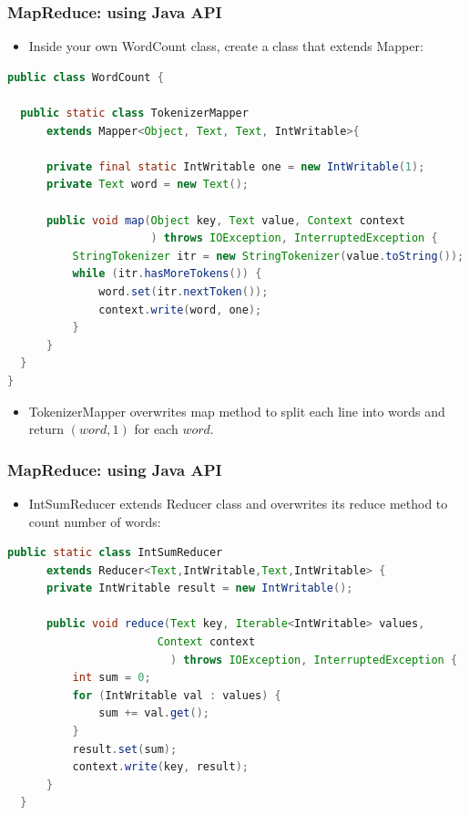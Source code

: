 \documentclass{beamer}
\begin{document}
\begin{frame}[fragile]
 \frametitle{MapReduce: using Java API}

\begin{itemize}
  \item Inside your own {\color{mycolorcode}WordCount} class, create a class that extends {\color{mycolorcode}Mapper}:
\end{itemize}
{\color{mycolorcode}
  \begin{lstlisting}[frame=single, basicstyle=\tiny,language=java]
public class WordCount {

  public static class TokenizerMapper
      extends Mapper<Object, Text, Text, IntWritable>{

      private final static IntWritable one = new IntWritable(1);
      private Text word = new Text();

      public void map(Object key, Text value, Context context
                      ) throws IOException, InterruptedException {
          StringTokenizer itr = new StringTokenizer(value.toString());
          while (itr.hasMoreTokens()) {
              word.set(itr.nextToken());
              context.write(word, one);
          }
      }
  }
}
  \end{lstlisting}
}
\begin{itemize}
  \item {\color{mycolorcode}TokenizerMapper} overwrites {\color{mycolorcode}map} method to split each line into words and return {\color{mycolorcode}$(word, 1)$} for each {\color{mycolorcode}$word$}.
\end{itemize}

\end{frame}


\begin{frame}[fragile]
 \frametitle{MapReduce: using Java API}
\begin{itemize}
  \item {\color{mycolorcode}IntSumReducer} extends {\color{mycolorcode}Reducer} class and overwrites its {\color{mycolorcode}reduce} method to count number of words:
\end{itemize}
{\color{mycolorcode}
  \begin{lstlisting}[frame=single, basicstyle=\tiny,language=java]
  public static class IntSumReducer
      extends Reducer<Text,IntWritable,Text,IntWritable> {
      private IntWritable result = new IntWritable();

      public void reduce(Text key, Iterable<IntWritable> values,
                       Context context
                         ) throws IOException, InterruptedException {
          int sum = 0;
          for (IntWritable val : values) {
              sum += val.get();
          }
          result.set(sum);
          context.write(key, result);
      }
  }
  \end{lstlisting}
}
\end{frame}
\end{document}
